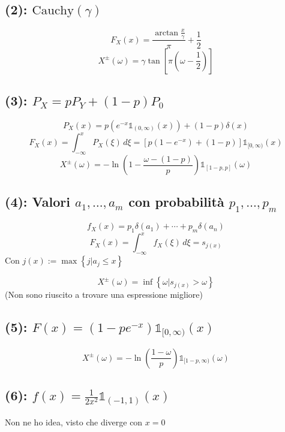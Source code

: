 \documentclass{article}
\begin{document}
\subsection{(2): $\mathrm{Cauchy}(\gamma)$}
\[
	F_X(x) = \frac{\arctan \frac{x}{\gamma}}{\pi} + \frac{1}{2}
\]
\[
	X^\pm(\omega) = \gamma \tan \left[\pi\left(\omega - \frac{1}{2}\right)\right]
\]


\subsection{(3): $P_X = pP_Y + (1-p)P_0$}
\[
	P_X(x) = p\left(e^{-x} \mathds{1}_{(0,\infty )}(x)\right) + (1-p) \delta(x)
\]
\[
	F_X(x) = \int_{-\infty }^{x} P_X \left(\xi\right) \, d\xi = \left[p\left(1-e^{-x}\right) + \left(1-p\right)\right] \mathds{1}_{[0,\infty )} (x)
\]
\[
	X^\pm(\omega) = -\ln \left(1- \frac{\omega-(1-p)}{p}\right) \mathds{1}_{[1-p,p]}(\omega)
\]

\subsection{(4): Valori $a_1, \dotsc, a_m$ con probabilità $p_1, \dotsc, p_m$}
\[
	f_X(x) = p_1 \delta(a_1) + \dotsb + p_m \delta(a_n)
\]
\[
	F_X(x) = \int_{-\infty }^{x} f_X \left(\xi\right) \, d\xi = s_{j(x)}
\]
Con $j(x) := \max\left\{j | a_j\leq x\right\}$

\[
	X^\pm (\omega) = \inf\left\{\omega | s_{j(x)} > \omega\right\}
\]
(Non sono riuscito a trovare una espressione migliore)

\subsection{(5): $F(x) = \left(1- pe^{-x}\right) \mathds{1}_{[0, \infty )}(x)$}
\[
	X^\pm\left(\omega\right) = - \ln\left(\frac{1-\omega}{p}\right) \mathds{1}_{[1-p,\infty )}(\omega)
\]

\subsection{(6): $f(x) = \frac{1}{2x^2} \mathds{1}_{(-1,1)}(x)$}
Non ne ho idea, visto che diverge con $x=0$
\end{document}
